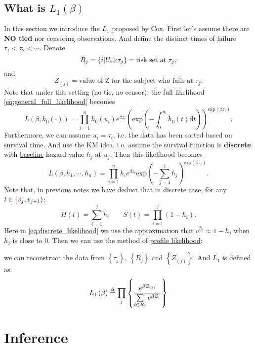 \documentclass[a4paper,12pt]{article}
\begin{document}
\subsection{What is $L_1\left(\beta\right)$}
\label{sec:what-is}

In this section we introduce the $L_1$ proposed by Cox. First let's assume there are \textbf{NO tied} nor censoring observations. And define the distinct times of failure $\tau_1 < \tau_2 < \cdots$. Denote
\[
  R_j = \left\{i\middle|U_i{\color{red} \geq}\tau_j\right\}
  = \text{risk set at }\tau_j
  ,
\]
and
\[
  Z_{\left(j\right)} = \text{value of Z for the subject who fails at $\tau_j$}
  .
\]
Note that under this setting (no tie, no censor), the full likelihood \eqref{eq:general_full_likelihood} becomes
\[
  L\left(\beta, h_0\left(\cdot\right)\right)
  = \prod\limits_{i = 1}^n
  h_0\left(u_i\right)
  e^{\beta z_i}
  \left(
    \mathrm{exp}\left(-\int_0^{u_i}h_0\left(t\right)\mathrm{d}t\right)
  \right)^{\mathrm{exp}\left(\beta z_i\right)}
  .
\]
Furthermore, we can assume $u_i = \tau_i$, i.e. the data has been sorted based on survival time. And use the KM idea, i.e. assume the survival function is \textbf{discrete} with \underline{baseline} hazard value $h_j$ at $u_j$. Then this likelihood becomes
\begin{equation}
  \label{eq:discrete_likelihood}
    L\left(\beta, h_1, \cdots, h_n\right)
  = \prod\limits_{i = 1}^n h_i e^{\beta z_i}
  \mathrm{exp}\left(
    - \sum\limits_{j = 1}^i h_j
  \right)^{\mathrm{exp}\left(\beta z_i\right)}
  .
\end{equation}
Note that, in previous notes we have deduct that in discrete case, for any $t\in {\color{red}\left[\right.} v_j, v_{j + 1})$:
\[
  H\left(t\right) = \sum\limits_{i = 1}^j h_i
  \quad\quad
  S\left(t\right) = \prod\limits_{i = 1}^j\left(1 - h_i\right)
  .
\]
Here in \eqref{eq:discrete_likelihood} we use the approximation that $e^{h_j} \approx 1 - h_j$ when $h_j$ is close to 0. Then we can use the method of \underline{profile likelihood}:
\par
we can reconstruct the data from $\left\{\tau_j\right\}$, $\left\{R_j\right\}$ and $\left\{Z_{\left(j\right)}\right\}$. And $L_1$ is defined as
\[
  L_1\left(\beta\right)
  \overset{\Delta}{=}
  \prod\limits_{j}\left\{
    \frac{e^{\beta Z_{{\color{red}\left(j\right)}}}}{
      \sum\limits_{l\in R_{j}}e^{\beta Z_{{\color{red}l}}}
    }
  \right\}
\]

\section{Inference}
\label{sec:inference}






\end{document}
